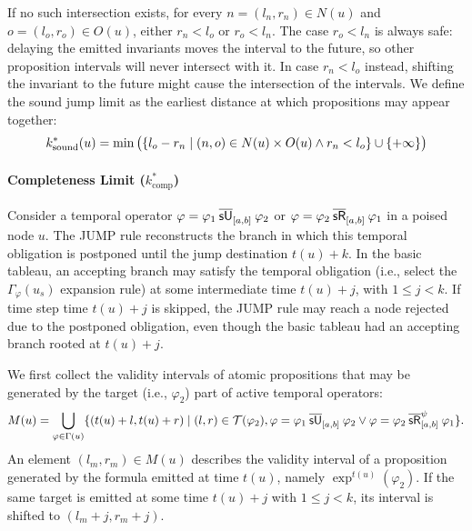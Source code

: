 \documentclass{easychair}
\begin{document}
If no such intersection exists, for every
$n=(l_n,r_n)\in N(u)$ and $o=(l_o,r_o)\in O(u)$, either $r_n<l_o$ or $r_o<l_n$.
%
The case $r_o < l_n$ is always safe: delaying the emitted invariants moves the interval to the future, so other proposition intervals will never intersect with it.
%
In case $r_n < l_o$ instead, shifting the invariant to the future might cause the intersection of the intervals.
We define the sound jump limit as the earliest distance at which propositions may appear together:
%
\begin{align*}
    k^{\ast}_{\text{sound}}(u) = \min\big(\set{l_o - r_n \mid (n, o) \in N(u) \times O(u) \land r_n < l_o} \cup \set{+\infty}\big)
\end{align*}


\paragraph{Completeness Limit ($k^{\ast}_{\text{comp}}$)}

Consider a temporal operator $\varphi = \msuntil{[a,b]}{\varphi_1}{\varphi_2}$ or $\varphi = \msrelease{[a,b]}{\varphi_2}{\varphi_1}$ in a poised node $u$.
The \textsf{JUMP} rule reconstructs the branch in which this temporal obligation is postponed until the jump destination $t(u) + k$. 
%
In the basic tableau, an accepting branch may satisfy the temporal obligation (i.e., select the $\Gamma_{\varphi}(u_s)$ expansion rule) at some intermediate time $t(u)+j$, with $1 \leq j < k$.
If time step time $t(u)+j$ is skipped, the \textsf{JUMP} rule may reach a node rejected due to the postponed obligation, even though the basic tableau had an accepting branch rooted at $t(u)+j$.

We first collect the validity intervals of atomic propositions that may be generated by the target (i.e., $\varphi_2$) part of active temporal operators:
%
\begin{align*}
    M(u) = \bigcup\limits_{\varphi \in \Gamma(u)} \set{(t(u) + l, t(u) + r) \mid (l, r) \in \tinv(\varphi_2), \varphi = \msuntil{[a,b]}{\varphi_1}{\varphi_2} \lor \varphi = \msrelease[\psi]{[a,b]}{\varphi_2}{\varphi_1} }.
\end{align*}
An element $(l_m,r_m)\in M(u)$ describes the validity interval of a proposition generated by the formula emitted at time $t(u)$, namely $\exp^{t(u)}(\varphi_2)$.
If the same target is emitted at some time $t(u)+j$ with $1 \leq j < k$, its interval is shifted to $(l_m+j,r_m+j)$.
\end{document}
